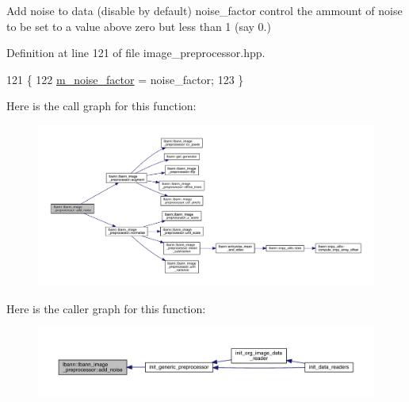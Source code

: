 Add noise to data (disable by default) noise\+\_\+factor control the ammount of noise to be set to a value above zero but less than 1 (say 0.) 

Definition at line 121 of file image\+\_\+preprocessor.\+hpp.


\begin{DoxyCode}
121                                           \{
122     \hyperlink{classlbann_1_1lbann__image__preprocessor_af860c1d78af06e4ae94ad68e3032fe92}{m\_noise\_factor} = noise\_factor;
123    \}
\end{DoxyCode}
Here is the call graph for this function\+:\nopagebreak
\begin{figure}[H]
\begin{center}
\leavevmode
\includegraphics[width=350pt]{classlbann_1_1lbann__image__preprocessor_a1726baf71e931108dc9192539e90c583_cgraph}
\end{center}
\end{figure}
Here is the caller graph for this function\+:\nopagebreak
\begin{figure}[H]
\begin{center}
\leavevmode
\includegraphics[width=350pt]{classlbann_1_1lbann__image__preprocessor_a1726baf71e931108dc9192539e90c583_icgraph}
\end{center}
\end{figure}
\mbox{\label{classlbann_1_1lbann__image__preprocessor_adb9e017aeac52a9b5d392f17188d1057}} 
